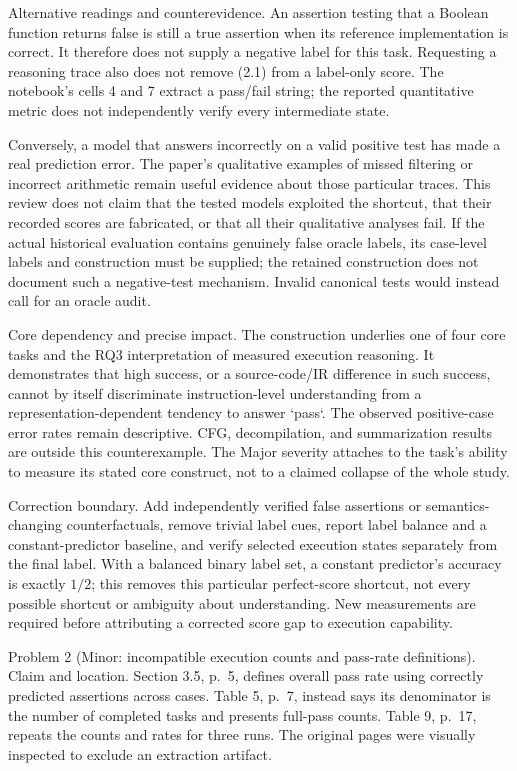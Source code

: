 \documentclass[10pt]{article}
\begin{document}
Alternative readings and counterevidence. An assertion testing that a Boolean function returns false is still a true assertion when its reference implementation is correct. It therefore does not supply a negative label for this task. Requesting a reasoning trace also does not remove (2.1) from a label-only score. The notebook’s cells 4 and 7 extract a pass/fail string; the reported quantitative metric does not independently verify every intermediate state.\par
Conversely, a model that answers incorrectly on a valid positive test has made a real prediction error. The paper’s qualitative examples of missed filtering or incorrect arithmetic remain useful evidence about those particular traces. This review does not claim that the tested models exploited the shortcut, that their recorded scores are fabricated, or that all their qualitative analyses fail. If the actual historical evaluation contains genuinely false oracle labels, its case-level labels and construction must be supplied; the retained construction does not document such a negative-test mechanism. Invalid canonical tests would instead call for an oracle audit.\par
Core dependency and precise impact. The construction underlies one of four core tasks and the RQ3 interpretation of measured execution reasoning. It demonstrates that high success, or a source-code/IR difference in such success, cannot by itself discriminate instruction-level understanding from a representation-dependent tendency to answer `pass`. The observed positive-case error rates remain descriptive. CFG, decompilation, and summarization results are outside this counterexample. The Major severity attaches to the task’s ability to measure its stated core construct, not to a claimed collapse of the whole study.\par
Correction boundary. Add independently verified false assertions or semantics-changing counterfactuals, remove trivial label cues, report label balance and a constant-predictor baseline, and verify selected execution states separately from the final label. With a balanced binary label set, a constant predictor’s accuracy is exactly \(1/2\); this removes this particular perfect-score shortcut, not every possible shortcut or ambiguity about understanding. New measurements are required before attributing a corrected score gap to execution capability.\par
Problem 2 (Minor: incompatible execution counts and pass-rate definitions).  Claim and location. Section 3.5, p. 5, defines overall pass rate using correctly predicted assertions across cases. Table 5, p. 7, instead says its denominator is the number of completed tasks and presents full-pass counts. Table 9, p. 17, repeats the counts and rates for three runs. The original pages were visually inspected to exclude an extraction artifact.\par
\end{document}
